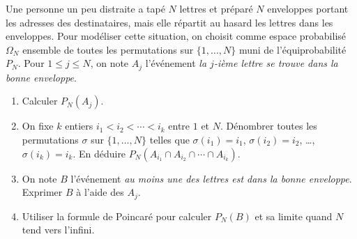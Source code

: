 \documentclass[a4paper,11pt,reqno]{amsart}
\begin{document}
\begin{exo}

  Une personne un peu distraite a tapé $ N $ lettres et préparé $ N $ enveloppes portant les adresses des destinataires, mais elle répartit au hasard les lettres dans les enveloppes. Pour modéliser cette situation, on choisit comme espace probabilisé $ \Omega_N $ ensemble de toutes les permutations sur $ \{ 1,\ldots,N \} $ muni de l'équiprobabilité $ P_N $. Pour $ 1 \le j \le N $, on note $ A_j $ l'événement \emph{la $ j$-ième lettre se trouve dans la bonne enveloppe}.
  \begin{enumerate}
    \item Calculer $ P_N(A_j) $.

    \item On fixe $ k $ entiers $ i_1 < i_2 < \cdots < i_k $ entre $ 1 $ et $ N $. Dénombrer toutes les permutations $ \sigma $ sur $ \{1,\ldots,N\} $ telles que $ \sigma(i_1)=i_1 $, $ \sigma(i_2)=i_2 $, \ldots, $ \sigma(i_k)=i_k $. En déduire $ P_N(  A_{i_1} \cap A_{i_2} \cap \cdots \cap A_{i_k} ) $.

    \item On note $ B $ l'événement \emph{au moins une des lettres est dans la bonne enveloppe}. Exprimer $ B $ à l'aide des $ A_j $.

    \item Utiliser la formule de Poincaré pour calculer $ P_N(B) $ et sa limite quand $ N $ tend vers l'infini.
  \end{enumerate}

\end{exo}
\end{document}
